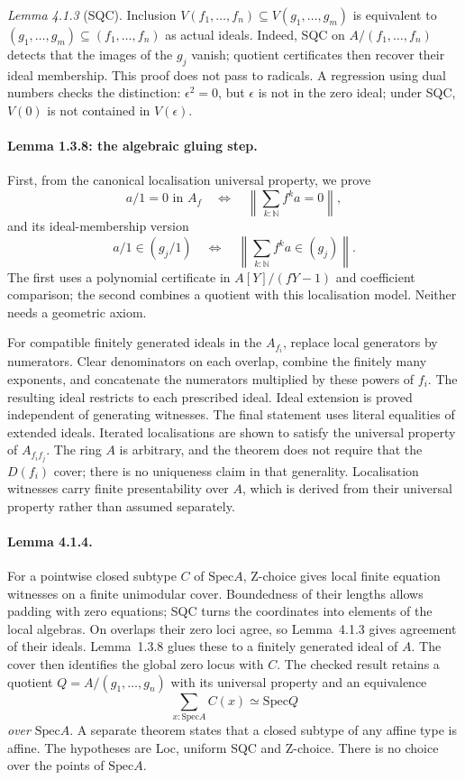 \documentclass[11pt]{article}
\newcommand{\Spec}{\mathrm{Spec}}
\theoremstyle{remark}
\begin{document}
\emph{Lemma 4.1.3} (SQC). Inclusion
$V(f_1,\ldots,f_n)\subseteq V(g_1,\ldots,g_m)$ is equivalent to
$(g_1,\ldots,g_m)\subseteq(f_1,\ldots,f_n)$ as actual ideals.
Indeed, SQC on $A/(f_1,\ldots,f_n)$ detects that the images of the $g_j$
vanish; quotient certificates then recover their ideal membership.
This proof does not pass to radicals. A regression using dual numbers
checks the distinction: $\epsilon^2=0$, but $\epsilon$ is not in the
zero ideal; under SQC, $V(0)$ is not contained in $V(\epsilon)$.

\paragraph{Lemma 1.3.8: the algebraic gluing step.}
First, from the canonical localisation universal property, we prove
\[
 a/1=0\text{ in }A_f
 \quad\Longleftrightarrow\quad
 \left\lVert\sum_{k:\mathbb N} f^k a=0\right\rVert ,
\]
and its ideal-membership version
\[
 a/1\in(g_j/1)
 \quad\Longleftrightarrow\quad
 \left\lVert\sum_{k:\mathbb N} f^k a\in(g_j)\right\rVert .
\]
The first uses a polynomial certificate in $A[Y]/(fY-1)$ and coefficient
comparison; the second combines a quotient with this localisation model.
Neither needs a geometric axiom.

For compatible finitely generated ideals in the $A_{f_i}$, replace local
generators by numerators. Clear denominators on each overlap, combine
the finitely many exponents, and concatenate the numerators multiplied
by these powers of $f_i$. The resulting ideal restricts to each
prescribed ideal. Ideal extension is proved independent of generating
witnesses. The final statement uses literal equalities of extended
ideals. Iterated localisations are shown to satisfy the universal
property of $A_{f_if_j}$. The ring $A$ is arbitrary, and the theorem
does not require that the $D(f_i)$ cover; there is no uniqueness claim
in that generality. Localisation witnesses carry finite presentability
over $A$, which is derived from their universal property rather than
assumed separately.

\paragraph{Lemma 4.1.4.}
For a pointwise closed subtype $C$ of $\Spec A$, Z-choice gives local
finite equation witnesses on a finite unimodular cover. Boundedness of
their lengths allows padding with zero equations; SQC turns the
coordinates into elements of the local algebras. On overlaps their
zero loci agree, so Lemma~4.1.3 gives agreement of their ideals.
Lemma~1.3.8 glues these to a finitely generated ideal of $A$.
The cover then identifies the global zero locus with $C$.
The checked result retains a quotient $Q=A/(g_1,\ldots,g_n)$ with its
universal property and an equivalence
\[
                     \sum_{x:\Spec A} C(x)\simeq\Spec Q
\]
\emph{over} $\Spec A$. A separate theorem states that a closed subtype
of any affine type is affine. The hypotheses are Loc, uniform SQC and
Z-choice. There is no choice over the points of $\Spec A$.
\end{document}
